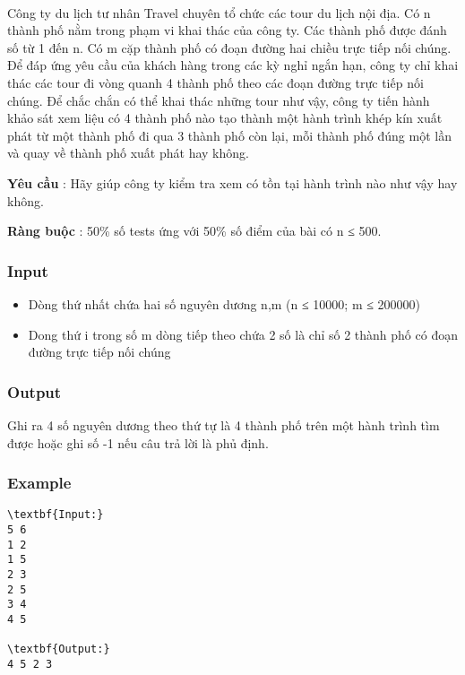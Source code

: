 

 

Công ty du lịch tư nhân Travel chuyên tổ chức các tour du lịch nội địa. Có n thành phố nằm trong phạm vi khai thác của công ty. Các thành phố được đánh số từ 1 đến n. Có m cặp thành phố có đoạn đường hai chiều trực tiếp nối chúng. Để đáp ứng yêu cầu của khách hàng trong các kỳ nghỉ ngắn hạn, công ty chỉ khai thác các tour đi vòng quanh 4 thành phố theo các đoạn đường trực tiếp nối chúng. Để chắc chắn có thể khai thác những tour như vậy, công ty tiến hành khảo sát xem liệu có 4 thành phố nào tạo thành một hành trình khép kín xuất phát từ một thành phố đi qua 3 thành phố còn lại, mỗi thành phố đúng một lần và quay về thành phố xuất phát hay không.

\textbf{Yêu cầu } : Hãy giúp công ty kiểm tra xem có tồn tại hành trình nào như vậy hay không.


\textbf{Ràng buộc } : 50\% số tests ứng với 50\% số điểm của bài có n ≤ 500.

\subsubsection{Input}
\begin{itemize}
	\item Dòng thứ nhất chứa hai số nguyên dương n,m (n ≤ 10000; m ≤ 200000)
	\item Dong thứ i trong số m dòng tiếp theo chứa 2 số là chỉ số 2 thành phố có đoạn đường trực tiếp nối chúng
\end{itemize}

\subsubsection{Output}

Ghi ra 4 số nguyên dương theo thứ tự là 4 thành phố trên một hành trình tìm được hoặc ghi số -1 nếu câu trả lời là phủ định.

\subsubsection{Example}
\begin{verbatim}
\textbf{Input:}
5 6
1 2
1 5
2 3
2 5
3 4
4 5

\textbf{Output:}
4 5 2 3
\end{verbatim}
